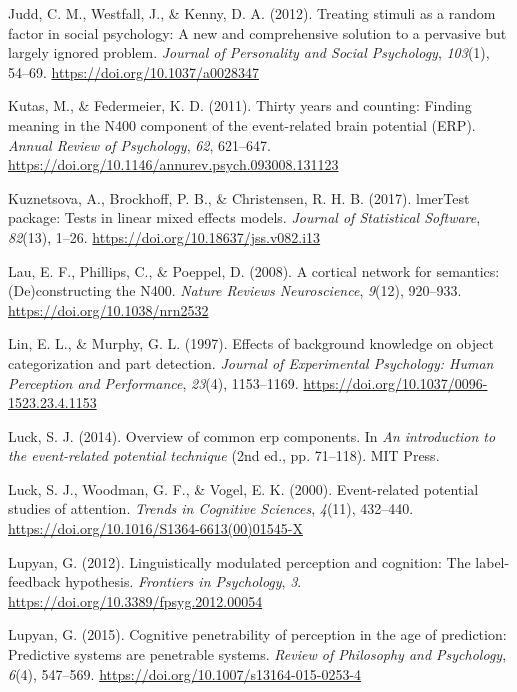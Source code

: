 \documentclass[
  english,
  man,11pt,floatsintext]{apa7}
\begin{document}
\leavevmode\hypertarget{ref-judd2012}{}%
Judd, C. M., Westfall, J., \& Kenny, D. A. (2012). Treating stimuli as a random factor in social psychology: A new and comprehensive solution to a pervasive but largely ignored problem. \emph{Journal of Personality and Social Psychology}, \emph{103}(1), 54--69. \url{https://doi.org/10.1037/a0028347}

\leavevmode\hypertarget{ref-kutas2011}{}%
Kutas, M., \& Federmeier, K. D. (2011). Thirty years and counting: Finding meaning in the N400 component of the event-related brain potential (ERP). \emph{Annual Review of Psychology}, \emph{62}, 621--647. \url{https://doi.org/10.1146/annurev.psych.093008.131123}

\leavevmode\hypertarget{ref-R-lmerTest}{}%
Kuznetsova, A., Brockhoff, P. B., \& Christensen, R. H. B. (2017). lmerTest package: Tests in linear mixed effects models. \emph{Journal of Statistical Software}, \emph{82}(13), 1--26. \url{https://doi.org/10.18637/jss.v082.i13}

\leavevmode\hypertarget{ref-lau2008}{}%
Lau, E. F., Phillips, C., \& Poeppel, D. (2008). A cortical network for semantics: (De)constructing the N400. \emph{Nature Reviews Neuroscience}, \emph{9}(12), 920--933. \url{https://doi.org/10.1038/nrn2532}

\leavevmode\hypertarget{ref-lin1997}{}%
Lin, E. L., \& Murphy, G. L. (1997). Effects of background knowledge on object categorization and part detection. \emph{Journal of Experimental Psychology: Human Perception and Performance}, \emph{23}(4), 1153--1169. \url{https://doi.org/10.1037/0096-1523.23.4.1153}

\leavevmode\hypertarget{ref-luck2014}{}%
Luck, S. J. (2014). Overview of common erp components. In \emph{An introduction to the event-related potential technique} (2nd ed., pp. 71--118). MIT Press.

\leavevmode\hypertarget{ref-luck2000}{}%
Luck, S. J., Woodman, G. F., \& Vogel, E. K. (2000). Event-related potential studies of attention. \emph{Trends in Cognitive Sciences}, \emph{4}(11), 432--440. \url{https://doi.org/10.1016/S1364-6613(00)01545-X}

\leavevmode\hypertarget{ref-lupyan2012}{}%
Lupyan, G. (2012). Linguistically modulated perception and cognition: The label-feedback hypothesis. \emph{Frontiers in Psychology}, \emph{3}. \url{https://doi.org/10.3389/fpsyg.2012.00054}

\leavevmode\hypertarget{ref-lupyan2015}{}%
Lupyan, G. (2015). Cognitive penetrability of perception in the age of prediction: Predictive systems are penetrable systems. \emph{Review of Philosophy and Psychology}, \emph{6}(4), 547--569. \url{https://doi.org/10.1007/s13164-015-0253-4}
\end{document}
